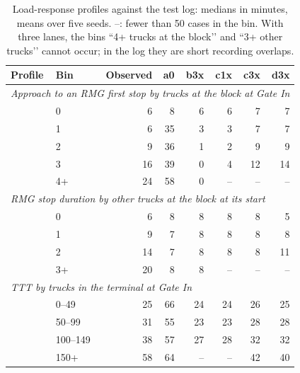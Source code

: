 \begin{table}[htbp]
\centering
\footnotesize
\setlength{\tabcolsep}{4pt}
\begin{tabular}{llrrrrrr}
\toprule
\textbf{Profile} & \textbf{Bin} & \textbf{Observed} & \textbf{a0} & \textbf{b3x} & \textbf{c1x} & \textbf{c3x} & \textbf{d3x} \\
\midrule
\multicolumn{8}{l}{\textit{Approach to an RMG first stop by trucks at the block at Gate In}} \\
 & 0 & 6 & 8 & 6 & 6 & 7 & 7 \\
 & 1 & 6 & 35 & 3 & 3 & 7 & 7 \\
 & 2 & 9 & 36 & 1 & 2 & 9 & 9 \\
 & 3 & 16 & 39 & 0 & 4 & 12 & 14 \\
 & 4+ & 24 & 58 & 0 & -- & -- & -- \\
\midrule
\multicolumn{8}{l}{\textit{RMG stop duration by other trucks at the block at its start}} \\
 & 0 & 6 & 8 & 8 & 8 & 8 & 5 \\
 & 1 & 9 & 7 & 8 & 8 & 8 & 8 \\
 & 2 & 14 & 7 & 8 & 8 & 8 & 11 \\
 & 3+ & 20 & 8 & 8 & -- & -- & -- \\
\midrule
\multicolumn{8}{l}{\textit{TTT by trucks in the terminal at Gate In}} \\
 & 0--49 & 25 & 66 & 24 & 24 & 26 & 25 \\
 & 50--99 & 31 & 55 & 23 & 23 & 28 & 28 \\
 & 100--149 & 38 & 57 & 27 & 28 & 32 & 32 \\
 & 150+ & 58 & 64 & -- & -- & 42 & 40 \\
\bottomrule
\end{tabular}
\caption{Load-response profiles against the test log: medians in minutes, means over five seeds. --: fewer than 50 cases in the bin. With three lanes, the bins ``4+ trucks at the block\rq\rq{} and ``3+ other trucks\rq\rq{} cannot occur; in the log they are short recording overlaps.}
\label{tab:rq2_profiles}
\end{table}
